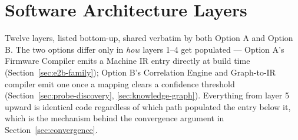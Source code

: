 \section{Software Architecture Layers}
\label{sec:software-design}

Twelve layers, listed bottom-up, shared verbatim by both Option A and Option B. The two options differ only in \emph{how} layers 1--4 get populated --- Option A's Firmware Compiler emits a Machine IR entry directly at build time (Section~\ref{sec:e2b-family}); Option B's Correlation Engine and Graph-to-IR compiler emit one once a mapping clears a confidence threshold (Section~\ref{sec:probe-discovery}, \ref{sec:knowledge-graph}). Everything from layer 5 upward is identical code regardless of which path populated the entry below it, which is the mechanism behind the convergence argument in Section~\ref{sec:convergence}.

